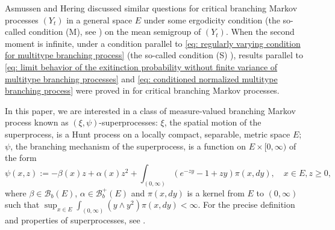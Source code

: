 \documentclass[12pt, a4paper]{amsart}
\theoremstyle{definition}
\numberwithin{equation}{section}
\begin{document}
	Asmussen and Hering \cite[Section~6.3~and~6.4]{AsmussenHering1983Branching} discussed similar questions for critical branching Markov processes $(Y_t)$ in a general space $E$ under some ergodicity condition (the so-called condition (M), see \cite[p.~156]{AsmussenHering1983Branching}) on the mean semigroup of $(Y_t)$.
	When the second moment is infinite, under a condition  parallel  to \eqref{eq: regularly varying condition for multitype branching process} (the so-called condition (S) \cite[p.~207]{AsmussenHering1983Branching}), results parallel to \eqref{eq: limit behavior of the exitinction probability without finite variance of multitype branching processes} and \eqref{eq: conditioned normalized multitype branching process} were proved in \cite[Theorem~4.2]{AsmussenHering1983Branching} for critical branching Markov processes.

    In this paper, we are interested in a class of measure-valued branching Markov process known as $(\xi, \psi)$-superprocesses:
    $\xi$, the spatial motion of the superprocess, is a Hunt process on a locally compact, separable, metric space $E$;
    $\psi$, the branching mechanism of the superprocess, is a function on $E \times [0,\infty)$ of the form
\begin{equation} \label{eq: branching mechanism}
	\psi(x,z):=
	- \beta(x) z + \alpha (x) z^2 + \int_{(0,\infty)} (e^{-zy} - 1 + zy) \pi(x,dy),
	\quad x\in E, z\geq 0,
\end{equation}
	where $\beta \in \mathscr B_b(E)$, $\alpha \in \mathscr B^+_b(E)$ and $\pi(x,dy)$ is a kernel from $E$ to $(0,\infty)$ such that $\sup_{x\in E} \int_{(0,\infty)} (y\wedge y^2) \pi(x,dy) < \infty$.
	For the precise definition and properties of superprocesses, see \cite{Li2011Measure-valued}.
\end{document}
